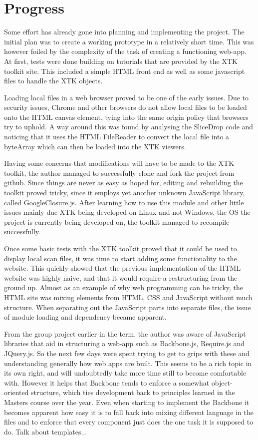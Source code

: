 \documentclass[a4paper,11pt,titlepage]{article}
\begin{document}
\section{Progress}

Some effort has already gone into planning and implementing the project. The initial plan was to create a working prototype in a relatively short time. This was however foiled by the complexity of the task of creating a functioning web-app. At first, tests were done building on tutorials that are provided by the XTK toolkit site. This included a simple HTML front end as well as some javascript files to handle the XTK objects.

Loading local files in a web browser proved to be one of the early issues. Due to security issues, Chrome and other browsers do not allow local files to be loaded onto the HTML canvas element, tying into the same origin policy that browsers try to uphold. A way around this was found by analysing the SliceDrop code and noticing that it uses the HTML FileReader to convert the local file into a byteArray which can then be loaded into the XTK viewers.

Having some concerns that modifications will have to be made to the XTK toolkit, the author managed to successfully clone and fork the project from github. Since things are never as easy as hoped for, editing and rebuilding the toolkit proved tricky, since it employs yet another unknown JavaScript library, called GoogleClosure.js. After learning how to use this module and other little issues mainly due XTK being developed on Linux and not Windows, the OS the project is currently being developed on, the toolkit managed to recompile successfully.

Once some basic tests with the XTK toolkit proved that it could be used to display local scan files, it was time to start adding some functionality to the website. This quickly showed that the previous implementation of the HTML website was highly naive, and that it would require a restructuring from the ground up. Almost as an example of why web programming can be tricky, the HTML site was mixing elements from HTML, CSS and JavaScript without much structure. When separating out the JavaScript parts into separate files, the issue of module loading and dependency became apparent.

From the group project earlier in the term, the author was aware of JavaScript libraries that aid in structuring a web-app such as Backbone.js, Require.js and JQuery.js. So the next few days were spent trying to get to grips with these and understanding generally how web apps are built. This seems to be a rich topic in its own right, and will undoubtedly take more time still to become comfortable with. However it helps that Backbone tends to enforce a somewhat object-oriented structure, which ties development back to principles learned in the Masters course over the year. Even when starting to implement the Backbone it becomes apparent how easy it is to fall back into mixing different language in the files and to enforce that every component just does the one task it is supposed to do. Talk about templates...
\end{document}
